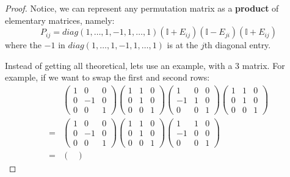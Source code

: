 \documentclass{exam}
\begin{document}
\begin{proof}

Notice, we can represent any permutation matrix as a \textbf{product} of elementary matrices, namely:
\[
P_{ij} = diag(1,\ldots,1,-1,1,\ldots,1)(\mathbb{I} + E_{ij})(\mathbb{I} - E_{ji})(\mathbb{I} + E_{ij})
\]
where the $-1$ in $diag(1,\ldots,1,-1,1,\ldots,1)$ is at the $j$th diagonal entry.

Instead of getting all theoretical, lets use an example, with a 3  matrix. For example, if we want to swap the first and second rows:
\begin{align*}
    &\begin{pmatrix}
        1 & 0 & 0 \\
        0 & -1 & 0 \\
        0 & 0 & 1
    \end{pmatrix}
    \begin{pmatrix}
        1 & 1 & 0 \\
        0 & 1 & 0 \\
        0 & 0 & 1
    \end{pmatrix}
    \begin{pmatrix}
        1 & 0 & 0 \\
        -1 & 1 & 0 \\
        0 & 0 & 1
    \end{pmatrix}
    \begin{pmatrix}
        1 & 1 & 0 \\
        0 & 1 & 0 \\
        0 & 0 & 1
    \end{pmatrix}
    \\
    =&
    \begin{pmatrix}
        1 & 0 & 0 \\
        0 & -1 & 0 \\
        0 & 0 & 1
    \end{pmatrix}
    \begin{pmatrix}
        1 & 1 & 0 \\
        0 & 1 & 0 \\
        0 & 0 & 1
    \end{pmatrix}
    \begin{pmatrix}
        1 & 1 & 0 \\
        -1 & 0 & 0 \\
        0 & 0 & 1
    \end{pmatrix}
    \\
    =&
    \begin{pmatrix}

\end{pmatrix}
\end{align*}
\end{proof}
\end{document}
